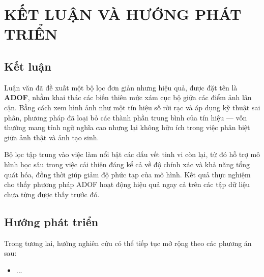 \chapter{KẾT LUẬN VÀ HƯỚNG PHÁT TRIỂN}

\section*{Kết luận}
Luận văn đã đề xuất một bộ lọc đơn giản nhưng hiệu quả, được đặt tên là \textbf{ADOF}, nhằm khai thác các biến thiên mức xám cục bộ giữa các điểm ảnh lân cận. Bằng cách xem hình ảnh như một tín hiệu số rời rạc và áp dụng kỹ thuật sai phân, phương pháp đã loại bỏ các thành phần trung bình của tín hiệu — vốn thường mang tính ngữ nghĩa cao nhưng lại không hữu ích trong việc phân biệt giữa ảnh thật và ảnh tạo sinh.

Bộ lọc tập trung vào việc làm nổi bật các dấu vết tinh vi còn lại, từ đó hỗ trợ mô hình học sâu trong việc cải thiện đáng kể cả về độ chính xác và khả năng tổng quát hóa, đồng thời giúp giảm độ phức tạp của mô hình. Kết quả thực nghiệm cho thấy phương pháp ADOF hoạt động hiệu quả ngay cả trên các tập dữ liệu chưa từng được thấy trước đó.

\section*{Hướng phát triển}
Trong tương lai, hướng nghiên cứu có thể tiếp tục mở rộng theo các phương án sau:

\begin{itemize}
	\item ...
\end{itemize}



%
%

